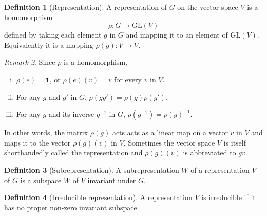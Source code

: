 \documentclass[12pt, a4paper, twoside]{article}
\newcommand{\C}{\mathbb{C}}
\newcommand{\GL}{\text{GL}}
\newcommand{\1}{\mathbf{1}}
\theoremstyle{definition}
\newtheorem{definition}{Definition}[section]
\theoremstyle{plain}
\theoremstyle{remark}
\newtheorem{remark}[definition]{Remark}
\newtheorem{example}[definition]{Example}
\begin{document}
	\begin{definition}[Representation]
		A representation of $G$ on the vector space $V$ is a homomorphism
		\[
		\rho: G \rightarrow \GL(V) 
		\]
		defined by taking each element $g$ in $G$ and mapping it to an element of $\GL(V)$. Equivalently it is a mapping $\rho(g): V \rightarrow V$. 
	\end{definition}
	\begin{remark}
		Since $\rho$ is a homomorphism, 
		\begin{enumerate}[i)]
			\item $\rho(e) = \1$, or $\rho(e)(v)=v$ for every $v$ in $V$.
			\item For any $g$ and $g'$ in $G$, $\rho(gg') = \rho(g)\rho(g')$.
			\item For any $g$ and its inverse $g^{-1}$ in $G$, $\rho(g^{-1}) = \rho(g)^{-1}$.
		\end{enumerate}
	\end{remark}
		
 	In other words, the matrix $\rho(g)$ acts acts as a linear map on a vector $v$ in $V$ and maps it to the vector $\rho(g)(v)$ in $V$. Sometimes the vector space $V$ is itself shorthandedly called the representation and $\rho(g)(v)$ is abbreviated to $gv$.
	
	
	\begin{definition}[Subrepresentation]
		A subrepresentation $W$ of a representation $V$ of $G$ is a subspace $W$ of $V$ invariant under $G$.
	\end{definition}
	
	
	\begin{definition}[Irreducible representation]
		A representation $V$ is irreducible if it has no proper non-zero invariant subspace.
	\end{definition}
	
\end{document}
